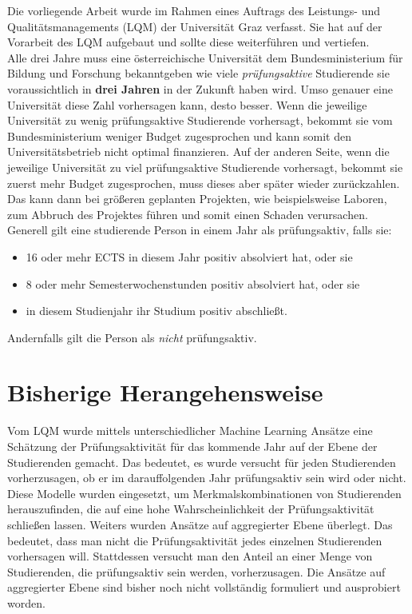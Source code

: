 

Die vorliegende Arbeit wurde im Rahmen eines Auftrags des Leistungs- und Qualit\"atsmanagements (LQM) der
Universität Graz verfasst. Sie hat auf der Vorarbeit des LQM aufgebaut und sollte diese weiterf\"uhren
und vertiefen. \\

Alle drei Jahre muss eine \"osterreichische Universität dem Bundesministerium f\"ur Bildung und Forschung
bekanntgeben wie viele \textit{pr\"ufungsaktive} Studierende sie voraussichtlich in \textbf{drei Jahren}
in der Zukunft haben wird. Umso genauer eine Universität diese Zahl vorhersagen kann, desto besser.
Wenn die jeweilige Universität zu wenig pr\"ufungsaktive Studierende vorhersagt, bekommt sie vom Bundesministerium
weniger Budget zugesprochen und kann somit den Universitätsbetrieb nicht optimal finanzieren. Auf der anderen Seite,
wenn die jeweilige Universität zu viel pr\"ufungsaktive Studierende vorhersagt, bekommt sie zuerst mehr Budget zugesprochen,
muss dieses aber sp\"ater wieder zur\"uckzahlen. Das kann dann bei gr\"o{\ss}eren geplanten Projekten, wie beispielsweise Laboren,
zum Abbruch des Projektes f\"uhren und somit einen Schaden verursachen. \\

\noindent Generell gilt eine studierende Person in einem Jahr als pr\"ufungsaktiv, falls sie:

\begin{itemize}
    \item 16 oder mehr ECTS in diesem Jahr positiv absolviert hat, oder sie
    \item 8 oder mehr Semesterwochenstunden positiv absolviert hat, oder sie
    \item in diesem Studienjahr ihr Studium positiv abschlie{\ss}t.
\end{itemize}
Andernfalls gilt die Person als \textit{nicht} pr\"ufungsaktiv. \\




\section{Bisherige Herangehensweise}

Vom LQM wurde mittels unterschiedlicher Machine Learning Ans\"atze eine Sch\"atzung der Pr\"ufungsaktivit\"at
f\"ur das kommende Jahr auf der Ebene der Studierenden gemacht. 
Das bedeutet, es wurde versucht f\"ur jeden Studierenden vorherzusagen, ob er im darauffolgenden Jahr pr\"ufungsaktiv sein wird oder nicht.
Diese Modelle wurden eingesetzt, um Merkmalskombinationen von Studierenden herauszufinden,
die auf eine hohe Wahrscheinlichkeit der Pr\"ufungsaktivit\"at schlie{\ss}en lassen.
Weiters wurden Ans\"atze auf aggregierter Ebene \"uberlegt. Das bedeutet, dass man nicht die Pr\"ufungsaktivit\"at jedes
einzelnen Studierenden vorhersagen will. Stattdessen
versucht man den Anteil an einer Menge von Studierenden, die pr\"ufungsaktiv sein werden, vorherzusagen.
Die Ans\"atze auf aggregierter Ebene sind bisher noch nicht vollst\"andig formuliert und ausprobiert worden. \\


